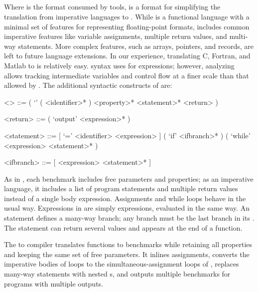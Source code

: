 \documentclass[main.tex]{subfiles}
\begin{document}
\subsection{\surface}

Where \core is the format consumed by tools,
  \surface is a format for simplifying the translation
  from imperative languages to \core.
While \core is a functional language
  with a minimal set of features
  for representing floating-point formats,
  \surface includes common imperative features
  like variable assignments,
  multiple return values,
  and multi-way  statements.
More complex features,
  such as arrays, pointers, and records,
  are left to future language extensions.
In our experience,
  translating C, Fortran, and Matlab to \surface is relatively easy.
\surface syntax uses \core for expressions;
  however, analyzing \surface allows tracking intermediate variables
  and control flow at a finer scale than that allowed by \core.
The additional syntactic constructs of \surface are:

\begin{grammar}
<\surface> ::= ( `\surface' ( <identifier>* ) <property>* <statement>* <return> )

<return> ::= ( `output' <expression>* )

<statement> ::= [ `=' <identifier> <expression> ]
\alt ( `if' <ifbranch>* )
\alt ( `while' <expression> <statement>* )

<ifbranch> ::= [ <expression> <statement>* ]
\end{grammar}

As in \core, each \surface benchmark
  includes free parameters and properties;
  as an imperative language,
  it includes a list of program statements
  and multiple return values
  instead of a single body expression.
Assignments and while loops behave in the usual way.
Expressions in \surface are simply \core expressions,
  evaluated in the same way.
An  statement defines a many-way branch;
  any  branch must be the last branch in its .
The  statement can return several values and appears
  at the end of a function.

The \surface to \core compiler
  translates \surface functions to \core benchmarks
  while retaining all properties and keeping the same set of free parameters.
It inlines assignments, converts the imperative bodies of \surface loops
  to the simultaneous-assignment loops of \core,
  replaces many-way  statements with nested s,
  and outputs multiple \core benchmarks for \surface programs with
  multiple outputs.
\end{document}
